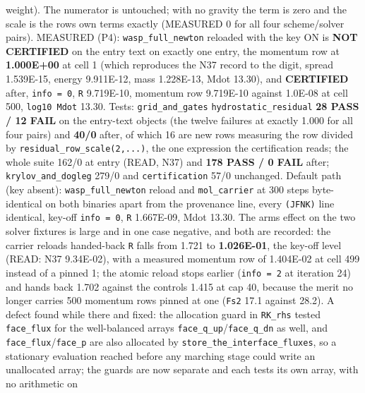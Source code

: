 \documentclass[english,a4paper]{my_memo}
\begin{document}
\begin{itemize}
  weight). The numerator is untouched; with no gravity the term is zero and
  the scale is the row\textquotesingle s own terms exactly (MEASURED 0 for all four
  scheme/solver pairs). MEASURED (P4): \texttt{wasp\_full\_newton} reloaded with the
  key ON is \textbf{NOT CERTIFIED} on the entry text on exactly one entry, the
  momentum row at \textbf{1.000E+00} at cell 1 (which reproduces the N37 record to
  the digit, spread 1.539E-15, energy 9.911E-12, mass 1.228E-13, Mdot 13.30),
  and \textbf{CERTIFIED} after, \texttt{info\ =\ 0}, \texttt{\textbar{}\textbar{}R\textbar{}\textbar{}} 9.719E-10, momentum row
  9.719E-10 against 1.0E-08 at cell 500, \texttt{log10\ Mdot} 13.30. Tests:
  \texttt{grid\_and\_gates} \texttt{hydrostatic\_residual} \textbf{28 PASS / 12 FAIL} on the
  entry-text objects (the twelve failures at exactly 1.000 for all four
  pairs) and \textbf{40/0} after, of which 16 are new rows measuring the row
  divided by \texttt{residual\_row\_scale(2,...)}, the one expression the
  certification reads; the whole suite 162/0 at entry (READ, N37) and \textbf{178
  PASS / 0 FAIL} after; \texttt{krylov\_and\_dogleg} 279/0 and \texttt{certification} 57/0
  unchanged. Default path (key absent): \texttt{wasp\_full\_newton} reload and
  \texttt{mol\_carrier} at 300 steps byte-identical on both binaries apart from the
  provenance line, every \texttt{(JFNK)} line identical, key-off \texttt{info\ =\ 0}, \texttt{\textbar{}\textbar{}R\textbar{}\textbar{}}
  1.667E-09, Mdot 13.30. The arm\textquotesingle s effect on the two solver fixtures is large
  and in one case negative, and both are recorded: the carrier reload\textquotesingle s
  handed-back \texttt{\textbar{}\textbar{}R\textbar{}\textbar{}} falls from 1.721 to \textbf{1.026E-01}, the key-off level
  (READ: N37 9.34E-02), with a measured momentum row of 1.404E-02 at cell 499
  instead of a pinned 1; the atomic reload stops earlier (\texttt{info\ =\ 2} at
  iteration 24) and hands back 1.702 against the control\textquotesingle s 1.415 at cap 40,
  because the merit no longer carries 500 momentum rows pinned at one
  (\texttt{\textbar{}\textbar{}Fs\textbar{}\textbar{}2} 17.1 against 28.2). A defect found while there and fixed: the
  allocation guard in \texttt{RK\_rhs} tested \texttt{face\_flux} for the well-balanced
  arrays \texttt{face\_q\_up}/\texttt{face\_q\_dn} as well, and \texttt{face\_flux}/\texttt{face\_p} are also
  allocated by \texttt{store\_the\_interface\_fluxes}, so a stationary evaluation
  reached before any marching stage could write an unallocated array; the
  guards are now separate and each tests its own array, with no arithmetic on

\end{itemize}
\end{document}
